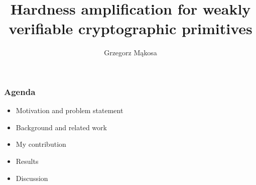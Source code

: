 \documentclass[first,firstsupp,handout,last]{ETHclass}
\begin{document}
\title{Hardness amplification for weakly verifiable cryptographic primitives}
\author{Grzegorz M\k{a}kosa}

\begin{frame}
\maketitle
\end{frame}

\begin{frame}[t]
\frametitle{Agenda}
\begin{itemize}
  \item<+-> Motivation and problem statement
  \item<+-> Background and related work
  \item<+-> My contribution
  \item<+-> Results
  \item<+-> Discussion
\end{itemize}
\end{frame}
\end{document}
